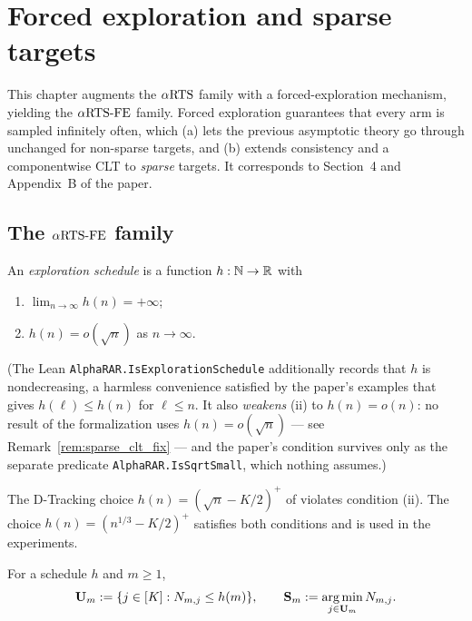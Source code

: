 \chapter{Forced exploration and sparse targets}
\label{chap:forced}

This chapter augments the $\alpha\text{RTS}$ family with a forced-exploration mechanism,
yielding the $\alpha\text{RTS-FE}$ family. Forced exploration guarantees that every arm is
sampled infinitely often, which (a) lets the previous asymptotic theory go
through unchanged for non-sparse targets, and (b) extends consistency and a
componentwise CLT to \emph{sparse} targets. It corresponds to Section~4 and
Appendix~B of the paper.

\section{The \texorpdfstring{$\alpha\text{RTS-FE}$}{aRTS-FE} family}
\label{sec:forced_def}

\begin{definition}\label{def:exploration_schedule}
\leanok
An \emph{exploration schedule} is a function $h : \mathbb{N} \to \mathbb{R}$ with
\begin{enumerate}
  \item[(i)] $\lim_{n\to\infty} h(n) = +\infty$;
  \item[(ii)] $h(n) = o(\sqrt n)$ as $n\to\infty$.
\end{enumerate}
(The Lean \texttt{AlphaRAR.IsExplorationSchedule} additionally records that $h$ is nondecreasing, a
harmless convenience satisfied by the paper's examples that gives $h(\ell)\le h(n)$ for $\ell\le n$.
It also \emph{weakens} (ii) to $h(n)=o(n)$: no result of the formalization uses $h(n)=o(\sqrt n)$
--- see Remark~\ref{rem:sparse_clt_fix} --- and the paper's condition survives only as the separate
predicate \texttt{AlphaRAR.IsSqrtSmall}, which nothing assumes.)
\end{definition}

\begin{example}\label{ex:h_choice}
The D-Tracking choice $h(n) = (\sqrt n - K/2)^+$ of \cite{garivier2016optimal}
violates condition (ii). The choice $h(n) = (n^{1/3} - K/2)^+$ satisfies both
conditions and is used in the experiments.
\end{example}

\begin{definition}\label{def:underexplored_sets}
For a schedule $h$ and $m\ge1$,
\[
  \mathbf{U}_m := \{ j\in[K] : N_{m,j} \le h(m)\}, \qquad
  \mathbf{S}_m := \operatorname*{arg\,min}_{j\in\mathbf{U}_m} N_{m,j}.
\]
\end{definition}

